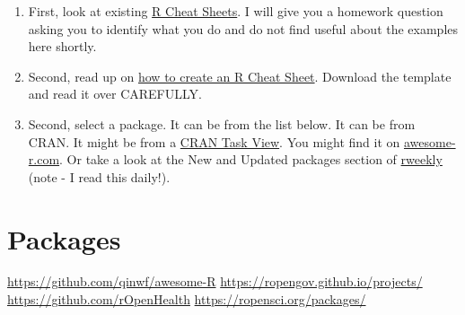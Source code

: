 \documentclass[]{tufte-handout}
\begin{document}
\begin{enumerate}
\def\labelenumi{\arabic{enumi}.}
\item
  First, look at existing
  \href{https://rstudio.com/resources/cheatsheets/}{R Cheat Sheets}. I
  will give you a homework question asking you to identify what you do
  and do not find useful about the examples here shortly.
\item
  Second, read up on
  \href{https://rstudio.com/resources/cheatsheets/how-to-contribute-a-cheatsheet/}{how
  to create an R Cheat Sheet}. Download the template and read it over
  CAREFULLY.
\item
  Second, select a package. It can be from the list below. It can be
  from CRAN. It might be from a
  \href{https://cran.r-project.org/web/views/}{CRAN Task View}. You
  might find it on \href{https://awesome-r.com/}{awesome-r.com}. Or take
  a look at the New and Updated packages section of
  \href{https://rweekly.org/\#NewPackages}{rweekly} (note - I read this
  daily!).
\end{enumerate}

\hypertarget{packages}{%
\section{Packages}\label{packages}}

\url{https://github.com/qinwf/awesome-R}
\url{https://ropengov.github.io/projects/}
\url{https://github.com/rOpenHealth}
\url{https://ropensci.org/packages/}
\end{document}
